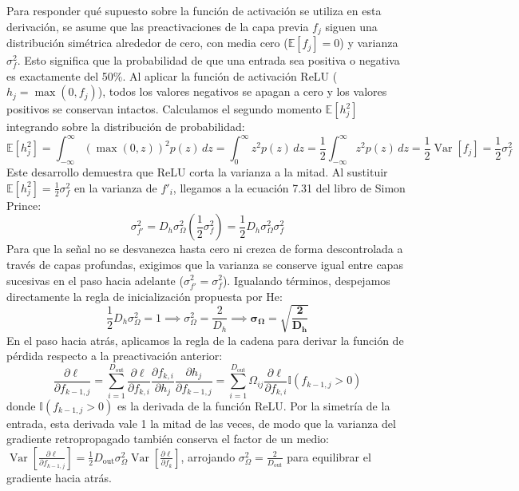 \documentclass[10pt,a4paper]{article}
\begin{document}
{Para responder qué supuesto sobre la función de activación se utiliza en esta derivación, se asume que las preactivaciones de la capa previa $f_j$ siguen una distribución simétrica alrededor de cero, con media cero ($\mathbb{E}[f_j] = 0$) y varianza $\sigma_f^2$. Esto significa que la probabilidad de que una entrada sea positiva o negativa es exactamente del 50\%. Al aplicar la función de activación ReLU ($h_j = \max(0, f_j)$), todos los valores negativos se apagan a cero y los valores positivos se conservan intactos. Calculamos el segundo momento $\mathbb{E}[h_j^2]$ integrando sobre la distribución de probabilidad:
\[
\mathbb{E}[h_j^2] = \int_{-\infty}^{\infty} (\max(0, z))^2 p(z) \, dz = \int_{0}^{\infty} z^2 p(z) \, dz = \frac{1}{2} \int_{-\infty}^{\infty} z^2 p(z) \, dz = \frac{1}{2} \operatorname{Var}[f_j] = \frac{1}{2} \sigma_f^2
\]
Este desarrollo demuestra que ReLU corta la varianza a la mitad. Al sustituir $\mathbb{E}[h_j^2] = \frac{1}{2} \sigma_f^2$ en la varianza de $f'_i$, llegamos a la ecuación 7.31 del libro de Simon Prince:
\[
\sigma_{f'}^2 = D_h \sigma_\Omega^2 \left( \frac{1}{2} \sigma_f^2 \right) = \frac{1}{2} D_h \sigma_\Omega^2 \sigma_f^2
\]
Para que la señal no se desvanezca hasta cero ni crezca de forma descontrolada a través de capas profundas, exigimos que la varianza se conserve igual entre capas sucesivas en el paso hacia adelante ($\sigma_{f'}^2 = \sigma_f^2$). Igualando términos, despejamos directamente la regla de inicialización propuesta por He:
\[
\frac{1}{2} D_h \sigma_\Omega^2 = 1 \implies \sigma_\Omega^2 = \frac{2}{D_h} \implies \mathbf{\sigma_\Omega = \sqrt{\frac{2}{D_h}}}
\]
En el paso hacia atrás, aplicamos la regla de la cadena para derivar la función de pérdida respecto a la preactivación anterior:
\[
\frac{\partial \ell}{\partial f_{k-1, j}} = \sum_{i=1}^{D_{\text{out}}} \frac{\partial \ell}{\partial f_{k, i}} \frac{\partial f_{k, i}}{\partial h_j} \frac{\partial h_j}{\partial f_{k-1, j}} = \sum_{i=1}^{D_{\text{out}}} \Omega_{ij} \frac{\partial \ell}{\partial f_{k, i}} \mathbb{I}(f_{k-1, j} > 0)
\]
donde $\mathbb{I}(f_{k-1, j} > 0)$ es la derivada de la función ReLU. Por la simetría de la entrada, esta derivada vale 1 la mitad de las veces, de modo que la varianza del gradiente retropropagado también conserva el factor de un medio: $\operatorname{Var}\left[\frac{\partial \ell}{\partial f_{k-1, j}}\right] = \frac{1}{2} D_{\text{out}} \sigma_\Omega^2 \operatorname{Var}\left[\frac{\partial \ell}{\partial f_k}\right]$, arrojando $\sigma_\Omega^2 = \frac{2}{D_{\text{out}}}$ para equilibrar el gradiente hacia atrás.

}
\end{document}

